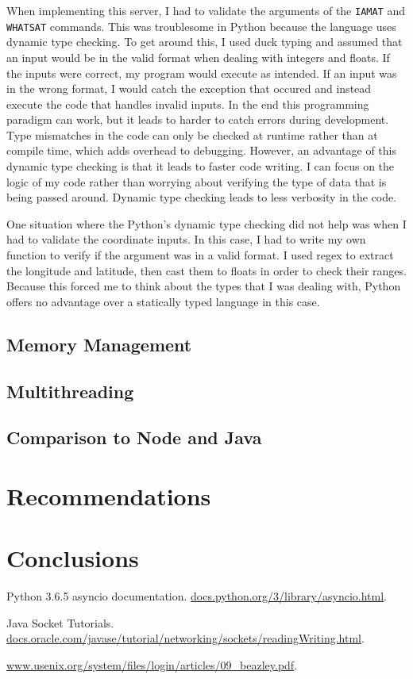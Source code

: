 \documentclass[letterpaper,twocolumn,10pt]{article}
\begin{document}
When implementing this server, I had to validate the arguments of the \texttt{IAMAT} and \texttt{WHATSAT} commands. This was
troublesome in Python because the language uses dynamic type checking. To get around this, I used duck typing and assumed that
an input would be in the valid format when dealing with integers and floats. If the inputs were correct, my program would execute
as intended. If an input was in the wrong format, I would catch the exception that occured and instead execute the code that handles
invalid inputs. In the end this programming paradigm can work, but it leads to harder to catch errors during development. Type mismatches
in the code can only be checked at runtime rather than at compile time, which adds overhead to debugging. However, an advantage of
this dynamic type checking is that it leads to faster code writing. I can focus on the logic of my code rather than worrying about
verifying the type of data that is being passed around. Dynamic type checking leads to less verbosity in the code.

One situation where the Python's dynamic type checking did not help was when I had to validate the coordinate inputs. In this case,
I had to write my own function to verify if the argument was in a valid format. I used regex to extract the longitude and latitude, then
cast them to floats in order to check their ranges. Because this forced me to think about the types that I was dealing with, Python
offers no advantage over a statically typed language in this case.

\subsection{Memory Management}

\subsection{Multithreading}

\subsection{Comparison to Node and Java}

\section{Recommendations}

\section{Conclusions}

\begin{thebibliography}{9}
        Python 3.6.5 asyncio documentation. \url{docs.python.org/3/library/asyncio.html}.

        Java Socket Tutorials. \url{docs.oracle.com/javase/tutorial/networking/sockets/readingWriting.html}.

        \url{www.usenix.org/system/files/login/articles/09_beazley.pdf}.
\end{thebibliography}
\end{document}
